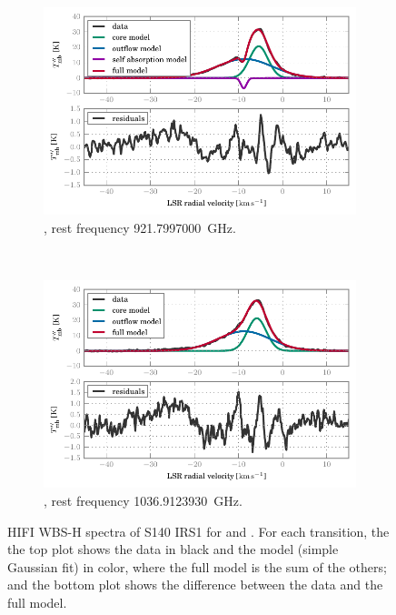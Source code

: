 \begin{figure}
    \centering
    \begin{subfigure}[b]{\textwidth}
        \includegraphics{87_00_00_corrected}
        \vspace{-.8em}
        \caption{, rest frequency \SI{ 921.7997000}{\giga\hertz}.}
    \end{subfigure}
    \\
    \bigskip
    \begin{subfigure}[b]{\textwidth}
        \includegraphics{98_00_00_corrected}
        \vspace{-.8em}
        \caption{, rest frequency \SI{1036.9123930}{\giga\hertz}.}
    \end{subfigure}
    \caption{
        HIFI WBS-H spectra of S140 IRS1 for  and .
        For each transition, the the top plot shows the data in black and the model (simple Gaussian fit) in color, where the full model is the sum of the others; and the bottom plot shows the difference between the data and the full model.
    }
    \label{fig:spectra_transitions}
\end{figure}


